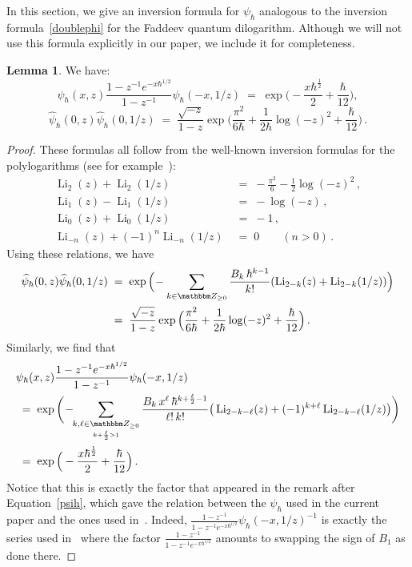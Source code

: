 \documentclass[12pt,reqno]{amsart}
\theoremstyle{definition}
\newtheorem{lemma}[theorem]{Lemma}
\def\BZ{\mathbbm Z}
\def\be{\begin{equation}}
\def\ee{\end{equation}}
\newcommand{\bea}{\begin{equation}\begin{aligned}}
\newcommand{\eea}{\end{aligned}\end{equation}}
\renewcommand{\=}{\;=\;}
\newcommand{\Li}{\operatorname{Li}}
\begin{document}
In this section, we give an inversion formula for $\psi_\hbar$ analogous to the
inversion formula~\eqref{doublephi} for the Faddeev quantum dilogarithm.
Although we will not use this formula explicitly in our paper, we include it
for completeness.

\begin{lemma}
\label{lem.inversion}
We have:
\be
\label{inv1}
\psi_{\hbar}(x,z)
  \frac{1-z^{-1}e^{-x\hbar^{1/2}}}{1-z^{-1}}
  \psi_{\hbar}(-x,1/z) \= \exp\Big(-
  \frac{x\hbar^{\frac{1}{2}}}{2}+\frac{\hbar}{12}\Big),
\ee  
\be
\label{inv2}
\widehat{\psi}_{\hbar}(0,z)
\widehat{\psi}_{\hbar}(0,1/z) 
\= \frac{\sqrt{-z}}{1-z}\exp\Big(\frac{\pi^2}{6\hbar}+\frac{1}{2\hbar}
\log(-z)^2+\frac{\hbar}{12}\Big) \,.
\ee
\end{lemma}

\begin{proof}
These formulas all follow from the well-known inversion formulas
for the polylogarithms (see for example~\cite{Oesterle}):
\bea
  \Li_{2}(z)+\Li_{2}(1/z)
  &\=
  -\frac{\pi^2}{6}-\frac{1}{2}\log(-z)^2\,,\\
  \Li_{1}(z)-\Li_{1}(1/z)
  &\=
  -\log(-z)\,,\\
  \Li_{0}(z)+\Li_{0}(1/z)
  &\=
  -1\,,\\
  \Li_{-n}(z)+(-1)^n\Li_{-n}(1/z)
  &\=0 \qquad (n>0) \,.
\eea
Using these relations, we have
\bea
\widehat{\psi}_{\hbar}(0,z)
\widehat{\psi}_{\hbar}(0,1/z)
&\=
\exp\Big(\!
-\sum_{k\in\BZ_{\geq0}}
\frac{B_{k}\,\hbar^{k-1}}{k!}(\Li_{2-k}(z)+\Li_{2-k}(1/z))\Big)\\
&\=
\frac{\sqrt{-z}}{1-z}\exp\Big(\frac{\pi^2}{6\hbar}+\frac{1}{2\hbar}
\log(-z)^2+\frac{\hbar}{12}\Big)\,.
\eea
Similarly, we find that
\be
\begin{aligned}
  &\psi_{\hbar}(x,z)
  \frac{1-z^{-1}e^{-x\hbar^{1/2}}}{1-z^{-1}}
  \psi_{\hbar}(-x,1/z)\\
  &\=
  \exp\bigg(\!-\!\!\sum_{\underset{k+\frac{\ell}{2}>1}{k,\ell\in\BZ_{\geq0}}}
  \frac{B_{k}\,x^{\ell}\,\hbar^{k+\frac{\ell}{2}-1}}{\ell!\,k!}
  \big(\Li_{2-k-\ell}(z)+(-1)^{k+\ell}\Li_{2-k-\ell}(1/z)\big)\bigg)\\
  &\=
  \exp\Big(-
  \frac{x\hbar^{\frac{1}{2}}}{2}+\frac{\hbar}{12}\Big)\,.
\end{aligned}
\ee
Notice that this is exactly the factor that appeared in the remark after
Equation~\eqref{psih}, which gave the relation between the $\psi_{\hbar}$ used
in the current paper and the ones used in~\cite[Eq.~1.9]{DG}.
Indeed, $\frac{1-z^{-1}}{1-z^{-1}e^{-x\hbar^{1/2}}}\psi_{\hbar}(-x,1/z)^{-1}$ is
exactly the series used in~\cite{DG} where the factor
$\frac{1-z^{-1}}{1-z^{-1}e^{-x\hbar^{1/2}}}$ amounts to swapping the sign of $B_{1}$
as done there.
\end{proof}
\end{document}
